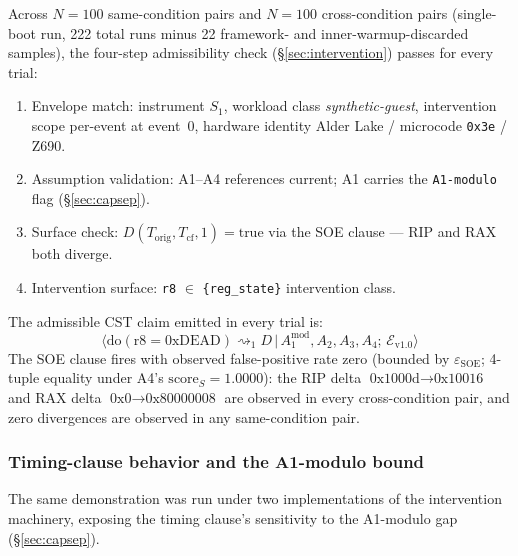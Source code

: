\documentclass[conference]{IEEEtran}
\newcommand{\Korig}{T_\text{orig}}
\newcommand{\Tcf}{T_\text{cf}}
\newcommand{\scoreS}{\text{score}_S}
\newcommand{\epsSOE}{\varepsilon_\text{SOE}}
\begin{document}
Across $N{=}100$ same-condition pairs and $N{=}100$ cross-condition
pairs (single-boot run, 222 total runs minus 22 framework- and
inner-warmup-discarded samples), the four-step admissibility check
(\S\ref{sec:intervention}) passes for every trial:
\begin{enumerate}[label=(\arabic*)]
\item Envelope match: instrument $S_1$, workload class
  \textit{synthetic-guest}, intervention scope per-event at event~0,
  hardware identity Alder Lake / microcode \texttt{0x3e} / Z690.
\item Assumption validation: A1--A4 references current; A1 carries
  the \texttt{A1-modulo} flag (\S\ref{sec:capsep}).
\item Surface check: $D(\Korig, \Tcf, 1) = \text{true}$ via the SOE
  clause --- RIP and RAX both diverge.
\item Intervention surface: \texttt{r8} $\in$ \texttt{\{reg\_state\}}
  intervention class.
\end{enumerate}
The admissible CST claim emitted in every trial is:
\begin{equation*}
\big\langle \text{do}(\text{r8}{=}\text{0xDEAD}) \rightsquigarrow_{1}
D \,\big|\, A_1^{\text{mod}}, A_2, A_3, A_4;\, \mathcal{E}_{\text{v1.0}} \big\rangle
\end{equation*}
The SOE clause fires with observed false-positive rate zero
(bounded by $\epsSOE$; 4-tuple equality under A4's
$\scoreS{=}1.0000$): the RIP
delta $\text{0x1000d} \to \text{0x10016}$ and RAX delta
$\text{0x0} \to \text{0x80000008}$ are observed in every
cross-condition pair, and zero divergences are observed in any
same-condition pair.

\subsubsection{Timing-clause behavior and the A1-modulo bound}

The same demonstration was run under two implementations of the
intervention machinery, exposing the timing clause's sensitivity to
the A1-modulo gap (\S\ref{sec:capsep}).
\end{document}
